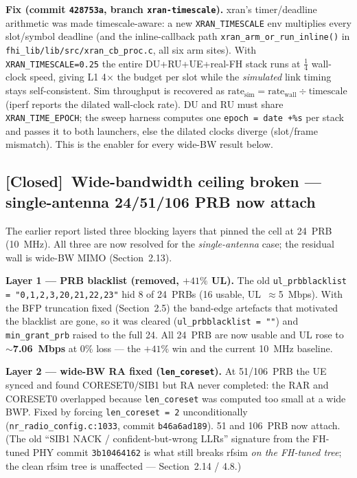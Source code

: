 \documentclass[11pt,a4paper]{article}
\newcommand{\closed}{\textcolor{closedcol}{\textbf{[Closed]}}}
\begin{document}
\textbf{Fix (commit \texttt{428753a}, branch \texttt{xran-timescale}).}
xran's timer/deadline arithmetic was made timescale-aware: a new \texttt{XRAN\_TIMESCALE} env
multiplies every slot/symbol deadline (and the inline-callback path
\texttt{xran\_arm\_or\_run\_inline()} in \texttt{fhi\_lib/lib/src/xran\_cb\_proc.c}, all six arm
sites). With \texttt{XRAN\_TIMESCALE=0.25} the entire DU+RU+UE+real-FH stack runs at
$\tfrac14$ wall-clock speed, giving L1 4$\times$ the budget per slot while the \emph{simulated}
link timing stays self-consistent. Sim throughput is recovered as
$\text{rate}_\text{sim} = \text{rate}_\text{wall} \div \text{timescale}$ (iperf reports the
dilated wall-clock rate). DU and RU must share \texttt{XRAN\_TIME\_EPOCH}; the sweep harness
computes one \texttt{epoch = date +\%s} per stack and passes it to both launchers, else the
dilated clocks diverge (slot/frame mismatch). This is the enabler for every wide-BW result
below.

\subsection{\texorpdfstring{\closed}{[Closed]}\ Wide-bandwidth ceiling broken --- single-antenna 24/51/106 PRB now attach}
\label{sec:widebw}

The earlier report listed three blocking layers that pinned the cell at 24~PRB (10~MHz). All
three are now resolved for the \emph{single-antenna} case; the residual wall is wide-BW MIMO
(Section~2.13).

\textbf{Layer 1 --- PRB blacklist (removed, $+41\%$ UL).}
The old \texttt{ul\_prbblacklist = "0,1,2,3,20,21,22,23"} hid 8 of 24~PRBs (16 usable,
UL~$\approx$5~Mbps). With the BFP truncation fixed (Section~2.5) the band-edge artefacts that
motivated the blacklist are gone, so it was cleared (\texttt{ul\_prbblacklist = ""}) and
\texttt{min\_grant\_prb} raised to the full 24. All 24~PRB are now usable and UL rose to
\textbf{$\sim$7.06~Mbps} at 0\% loss --- the $+41\%$ win and the current 10~MHz baseline.

\textbf{Layer 2 --- wide-BW RA fixed (\texttt{len\_coreset}).}
At 51/106~PRB the UE synced and found CORESET0/SIB1 but RA never completed: the RAR and
CORESET0 overlapped because \texttt{len\_coreset} was computed too small at a wide BWP. Fixed
by forcing \texttt{len\_coreset = 2} unconditionally
(\texttt{nr\_radio\_config.c:1033}, commit \texttt{b46a6ad189}). 51 and 106~PRB now attach.
(The old ``SIB1 NACK / confident-but-wrong LLRs'' signature from the FH-tuned PHY commit
\texttt{3b10464162} is what still breaks rfsim \emph{on the FH-tuned tree}; the clean rfsim
tree is unaffected --- Section~2.14 / 4.8.)
\end{document}

